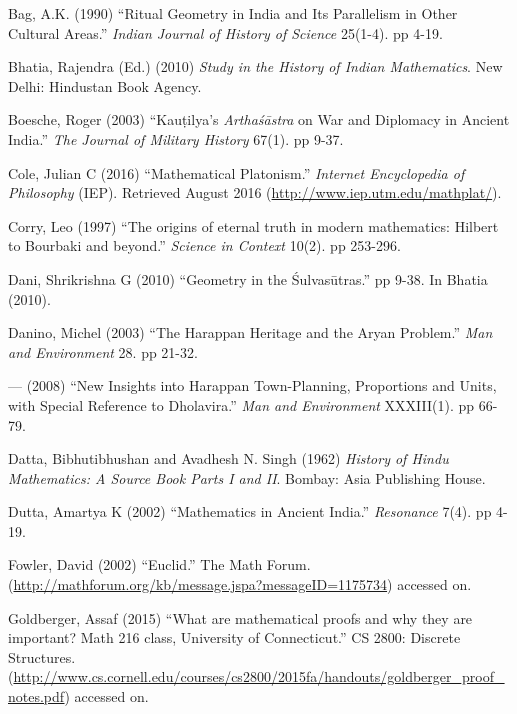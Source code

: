 \begin{thebibliography}{99}
\itemsep=2pt
Bag, A.K. (1990) ``Ritual Geometry in India and Its Parallelism in Other Cultural Areas.'' {\sl Indian Journal of History of Science} 25(1-4). pp 4-19.

Bhatia, Rajendra (Ed.) (2010) {\sl Study in the History of Indian Mathematics}. New Delhi: Hindustan Book Agency.

Boesche, Roger (2003) ``Kauṭilya's {\sl Arthaśāstra} on War and Diplomacy in Ancient India.'' {\sl The Journal of Military History} 67(1). pp 9-37.

Cole, Julian C (2016) ``Mathematical Platonism.'' {\sl Internet Encyclopedia of Philosophy} (IEP). Retrieved August 2016 (\url{http://www.iep.utm.edu/mathplat/}).

Corry, Leo (1997) ``The origins of eternal truth in modern mathematics: Hilbert to Bourbaki and beyond.'' {\sl Science in Context} 10(2). pp 253-296.

Dani, Shrikrishna G (2010) ``Geometry in the Śulvasūtras.'' pp 9-38. In Bhatia (2010).

Danino, Michel (2003) ``The Harappan Heritage and the Aryan Problem.'' {\sl Man and Environment} 28. pp 21-32.

--- (2008) ``New Insights into Harappan Town-Planning, Proportions and Units, with Special Reference to Dholavira.'' {\sl Man and Environment} XXXIII(1). pp 66-79.

Datta, Bibhutibhushan and Avadhesh N. Singh (1962) {\sl History of Hindu Mathematics: A Source Book Parts I and II}. Bombay: Asia Publishing House.

Dutta, Amartya K (2002) ``Mathematics in Ancient India.'' {\sl Resonance} 7(4). pp 4-19.

Fowler, David (2002) ``Euclid.'' The Math Forum. (\url{http://mathforum.org/kb/message.jspa?messageID=1175734}) accessed on.

Goldberger, Assaf (2015) ``What are mathematical proofs and why they are important? Math 216 class, University of Connecticut.'' CS 2800: Discrete Structures. (\url{http://www.cs.cornell.edu/courses/cs2800/2015fa/handouts/goldberger_proof_notes.pdf}) accessed on.


\end{thebibliography}
